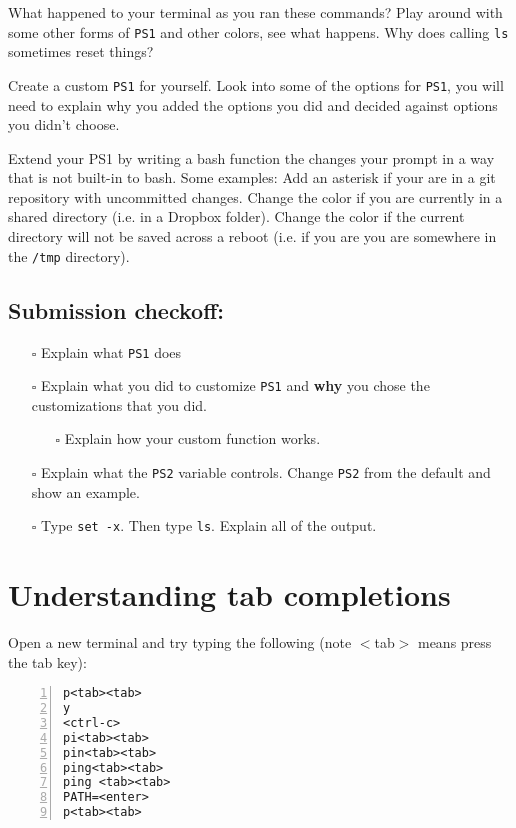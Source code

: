 \documentclass{article}
\begin{document}
\noindent
What happened to your terminal as you ran these commands?
Play around with some other forms of \texttt{PS1} and other colors, see what
happens. Why does calling \texttt{ls} sometimes reset things?

\medskip
\noindent
Create a custom \texttt{PS1} for yourself. Look into some of the options for
\texttt{PS1}, you will need to explain why you added the options you did and
decided against options you didn't choose.

\medskip
\noindent
Extend your PS1 by writing a bash function the changes your prompt in a way
that is not built-in to bash. Some examples: Add an asterisk if your are in a
git repository with uncommitted changes. Change the color if you are currently
in a shared directory (i.e. in a Dropbox folder). Change the color if the
current directory will not be saved across a reboot (i.e. if you are you are
somewhere in the \texttt{/tmp} directory).

\subsection*{Submission checkoff:}
\begin{itemize}
  \item[$\square$] Explain what \texttt{PS1} does
  \item[$\square$] Explain what you did to customize \texttt{PS1} and
    \textbf{why} you chose the customizations that you did.
    \begin{itemize}
      \item[$\square$] Explain how your custom function works.
    \end{itemize}
  \item[$\square$] Explain what the \texttt{PS2} variable controls. Change
    \texttt{PS2} from the default and show an example.
  \item[$\square$] Type \texttt{set -x}. Then type \texttt{ls}. Explain
    all of the output.
\end{itemize}


\section{Understanding tab completions}

\medskip
\noindent
Open a new terminal and try typing the following (note $<$tab$>$ means press
the tab key):

\begin{lstlisting}[numbers=left]
p<tab><tab>
y
<ctrl-c>
pi<tab><tab>
pin<tab><tab>
ping<tab><tab>
ping <tab><tab>
PATH=<enter>
p<tab><tab>
\end{lstlisting}
\end{document}
